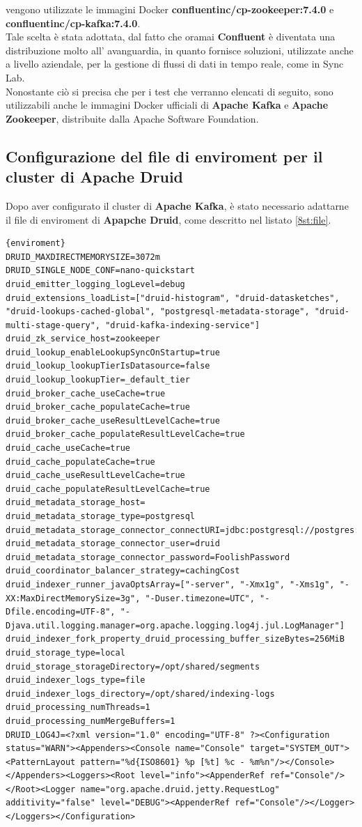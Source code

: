 vengono utilizzate le \gls{immagini Docker}{} \textbf{confluentinc/cp-zookeeper:7.4.0} e \\\textbf{confluentinc/cp-kafka:7.4.0}.\\
Tale scelta è stata adottata, dal fatto che oramai \textbf{Confluent} 
è diventata una distribuzione molto all' avanguardia, in quanto fornisce soluzioni, utilizzate anche a livello aziendale,
per la gestione di flussi di dati in tempo reale, come in Sync Lab.\\
Nonostante ciò si precisa che per i test che verranno elencati di seguito,
sono utilizzabili anche le \gls{immagini Docker}{} ufficiali di \textbf{Apache Kafka} e \textbf{Apache Zookeeper}, distribuite dalla 
\gls{Apache Software Foundation}.
\subsection{Configurazione del file di enviroment per il cluster di Apache Druid}
Dopo aver configurato il \gls{cluster}{} di \textbf{Apache Kafka}, è stato necessario adattarne il file di \gls{enviroment}{} di \textbf{Apapche Druid}, come descritto nel listato \ref{8st:file}.
\begin{lstlisting}[caption=\texttt{enviroment}, label=8st:file]{enviroment}
DRUID_MAXDIRECTMEMORYSIZE=3072m
DRUID_SINGLE_NODE_CONF=nano-quickstart
druid_emitter_logging_logLevel=debug
druid_extensions_loadList=["druid-histogram", "druid-datasketches", "druid-lookups-cached-global", "postgresql-metadata-storage", "druid-multi-stage-query", "druid-kafka-indexing-service"]
druid_zk_service_host=zookeeper
druid_lookup_enableLookupSyncOnStartup=true
druid_lookup_lookupTierIsDatasource=false
druid_lookup_lookupTier=_default_tier
druid_broker_cache_useCache=true
druid_broker_cache_populateCache=true
druid_broker_cache_useResultLevelCache=true
druid_broker_cache_populateResultLevelCache=true
druid_cache_useCache=true
druid_cache_populateCache=true
druid_cache_useResultLevelCache=true
druid_cache_populateResultLevelCache=true
druid_metadata_storage_host=
druid_metadata_storage_type=postgresql
druid_metadata_storage_connector_connectURI=jdbc:postgresql://postgres:5432/druid
druid_metadata_storage_connector_user=druid
druid_metadata_storage_connector_password=FoolishPassword
druid_coordinator_balancer_strategy=cachingCost
druid_indexer_runner_javaOptsArray=["-server", "-Xmx1g", "-Xms1g", "-XX:MaxDirectMemorySize=3g", "-Duser.timezone=UTC", "-Dfile.encoding=UTF-8", "-Djava.util.logging.manager=org.apache.logging.log4j.jul.LogManager"]
druid_indexer_fork_property_druid_processing_buffer_sizeBytes=256MiB
druid_storage_type=local
druid_storage_storageDirectory=/opt/shared/segments
druid_indexer_logs_type=file
druid_indexer_logs_directory=/opt/shared/indexing-logs
druid_processing_numThreads=1
druid_processing_numMergeBuffers=1
DRUID_LOG4J=<?xml version="1.0" encoding="UTF-8" ?><Configuration status="WARN"><Appenders><Console name="Console" target="SYSTEM_OUT"><PatternLayout pattern="%d{ISO8601} %p [%t] %c - %m%n"/></Console></Appenders><Loggers><Root level="info"><AppenderRef ref="Console"/></Root><Logger name="org.apache.druid.jetty.RequestLog" additivity="false" level="DEBUG"><AppenderRef ref="Console"/></Logger></Loggers></Configuration>
\end{lstlisting}
